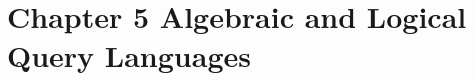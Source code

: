 \documentclass[../../main.tex]{subfiles}
\begin{document}
\section*{Chapter 5 Algebraic and Logical Query Languages}





\end{document}
